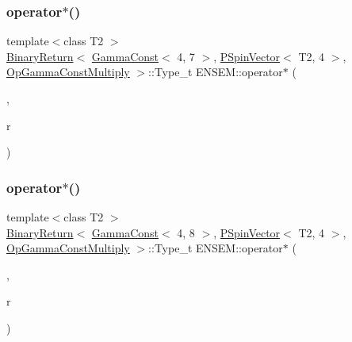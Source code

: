 \subsubsection{\texorpdfstring{operator$\ast$()}{operator*()}\hspace{0.1cm}{\footnotesize\ttfamily [8/32]}}
{\footnotesize\ttfamily template$<$class T2 $>$ \\
\mbox{\hyperlink{structENSEM_1_1BinaryReturn}{Binary\+Return}}$<$ \mbox{\hyperlink{classENSEM_1_1GammaConst}{Gamma\+Const}}$<$ 4, 7 $>$, \mbox{\hyperlink{classENSEM_1_1PSpinVector}{P\+Spin\+Vector}}$<$ T2, 4 $>$, \mbox{\hyperlink{structENSEM_1_1OpGammaConstMultiply}{Op\+Gamma\+Const\+Multiply}} $>$\+::Type\+\_\+t E\+N\+S\+E\+M\+::operator$\ast$ (\begin{DoxyParamCaption}\item[{const \mbox{\hyperlink{classENSEM_1_1GammaConst}{Gamma\+Const}}$<$ 4, 7 $>$ \&}]{,  }\item[{const \mbox{\hyperlink{classENSEM_1_1PSpinVector}{P\+Spin\+Vector}}$<$ T2, 4 $>$ \&}]{r }\end{DoxyParamCaption})\hspace{0.3cm}{\ttfamily [inline]}}

\mbox{\label{group__primspinvector_gadf1f85c537d85cf1fb2e4dbc24de9d81}} 
\subsubsection{\texorpdfstring{operator$\ast$()}{operator*()}\hspace{0.1cm}{\footnotesize\ttfamily [9/32]}}
{\footnotesize\ttfamily template$<$class T2 $>$ \\
\mbox{\hyperlink{structENSEM_1_1BinaryReturn}{Binary\+Return}}$<$ \mbox{\hyperlink{classENSEM_1_1GammaConst}{Gamma\+Const}}$<$ 4, 8 $>$, \mbox{\hyperlink{classENSEM_1_1PSpinVector}{P\+Spin\+Vector}}$<$ T2, 4 $>$, \mbox{\hyperlink{structENSEM_1_1OpGammaConstMultiply}{Op\+Gamma\+Const\+Multiply}} $>$\+::Type\+\_\+t E\+N\+S\+E\+M\+::operator$\ast$ (\begin{DoxyParamCaption}\item[{const \mbox{\hyperlink{classENSEM_1_1GammaConst}{Gamma\+Const}}$<$ 4, 8 $>$ \&}]{,  }\item[{const \mbox{\hyperlink{classENSEM_1_1PSpinVector}{P\+Spin\+Vector}}$<$ T2, 4 $>$ \&}]{r }\end{DoxyParamCaption})\hspace{0.3cm}{\ttfamily [inline]}}


